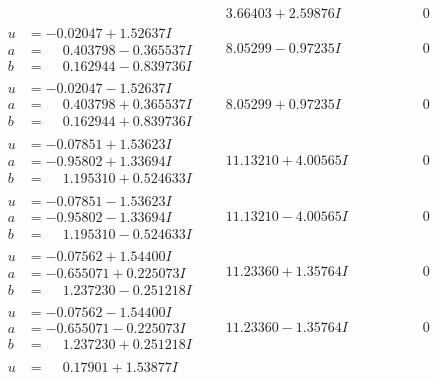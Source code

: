 \documentclass[1p]{elsarticle_modified}
\theoremstyle{definition}
\begin{document}
$$\begin{array}{c|c|c}
 & \phantom{-}3.66403 + 2.59876 I & \phantom{-0.000000 } 0 \\ \hline\begin{aligned}
u &= -0.02047 + 1.52637 I \\
a &= \phantom{-}0.403798 - 0.365537 I \\
b &= \phantom{-}0.162944 - 0.839736 I\end{aligned}
 & \phantom{-}8.05299 - 0.97235 I & \phantom{-0.000000 } 0 \\ \hline\begin{aligned}
u &= -0.02047 - 1.52637 I \\
a &= \phantom{-}0.403798 + 0.365537 I \\
b &= \phantom{-}0.162944 + 0.839736 I\end{aligned}
 & \phantom{-}8.05299 + 0.97235 I & \phantom{-0.000000 } 0 \\ \hline\begin{aligned}
u &= -0.07851 + 1.53623 I \\
a &= -0.95802 + 1.33694 I \\
b &= \phantom{-}1.195310 + 0.524633 I\end{aligned}
 & \phantom{-}11.13210 + 4.00565 I & \phantom{-0.000000 } 0 \\ \hline\begin{aligned}
u &= -0.07851 - 1.53623 I \\
a &= -0.95802 - 1.33694 I \\
b &= \phantom{-}1.195310 - 0.524633 I\end{aligned}
 & \phantom{-}11.13210 - 4.00565 I & \phantom{-0.000000 } 0 \\ \hline\begin{aligned}
u &= -0.07562 + 1.54400 I \\
a &= -0.655071 + 0.225073 I \\
b &= \phantom{-}1.237230 - 0.251218 I\end{aligned}
 & \phantom{-}11.23360 + 1.35764 I & \phantom{-0.000000 } 0 \\ \hline\begin{aligned}
u &= -0.07562 - 1.54400 I \\
a &= -0.655071 - 0.225073 I \\
b &= \phantom{-}1.237230 + 0.251218 I\end{aligned}
 & \phantom{-}11.23360 - 1.35764 I & \phantom{-0.000000 } 0 \\ \hline\begin{aligned}
u &= \phantom{-}0.17901 + 1.53877 I \\

\end{aligned}
\end{array}$$
\end{document}
